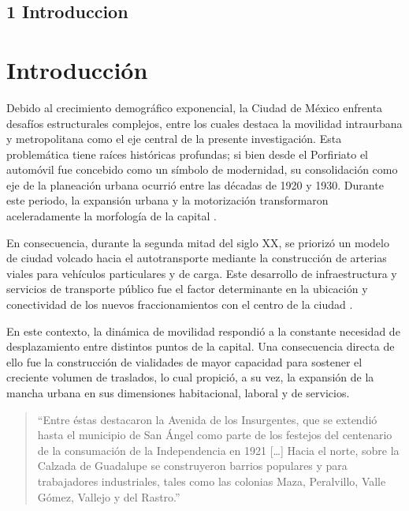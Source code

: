 
\subsection*{1 Introduccion}

\section*{Introducción}
\label{ch:introduccion}

Debido al crecimiento demográfico exponencial, la Ciudad de México enfrenta
desafíos estructurales complejos, entre los cuales destaca la movilidad intraurbana y
metropolitana como el eje central de la presente investigación. Esta problemática
tiene raíces históricas profundas; si bien desde el Porfiriato el automóvil fue
concebido como un símbolo de modernidad, su consolidación como eje de la
planeación urbana ocurrió entre las décadas de 1920 y 1930. Durante este periodo,
la expansión urbana y la motorización transformaron aceleradamente la morfología
de la capital \parencite{franco2022}.

En consecuencia, durante la segunda mitad del siglo XX, se priorizó un modelo de
ciudad volcado hacia el autotransporte mediante la construcción de arterias viales
para vehículos particulares y de carga. Este desarrollo de infraestructura y servicios
de transporte público fue el factor determinante en la ubicación y conectividad de los
nuevos fraccionamientos con el centro de la ciudad \parencite{franco2022}.

En este contexto, la dinámica de movilidad respondió a la constante necesidad
de desplazamiento entre distintos puntos de la capital. Una consecuencia directa
de ello fue la construcción de vialidades de mayor capacidad para sostener el
creciente volumen de traslados, lo cual propició, a su vez, la expansión de la
mancha urbana en sus dimensiones habitacional, laboral y de servicios.

\begin{quote}
``Entre éstas destacaron la Avenida de los Insurgentes, que se extendió hasta el
municipio de San Ángel como parte de los festejos del centenario de la consumación
de la Independencia en 1921 [\ldots] Hacia el norte, sobre la Calzada de Guadalupe
se construyeron barrios populares y para trabajadores industriales, tales como las
colonias Maza, Peralvillo, Valle Gómez, Vallejo y del Rastro.'' \parencite[p.~XX]{franco2022}
\end{quote}

